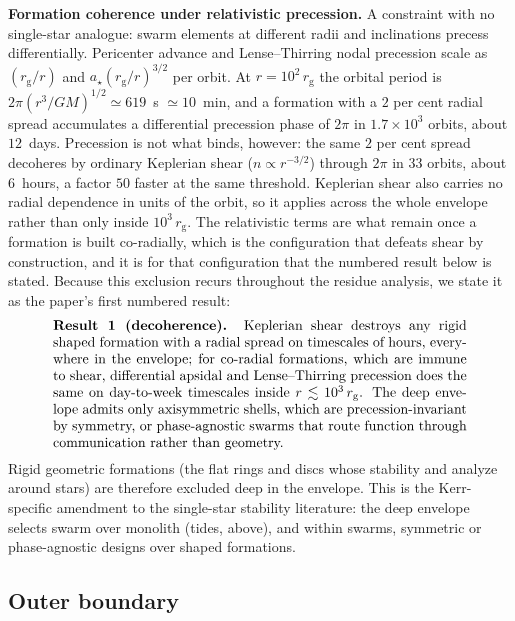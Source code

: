 \documentclass[11pt]{article}
\newcommand{\astar}{\ensuremath{a_\star}}
\newcommand{\rg}{\ensuremath{r_{\mathrm{g}}}}
\begin{document}
\textbf{Formation coherence under relativistic precession.} A constraint with no single-star analogue: swarm elements at different radii and inclinations precess differentially. Pericenter advance and Lense--Thirring nodal precession scale as $(\rg/r)$ and $\astar(\rg/r)^{3/2}$ per orbit. At $r = 10^{2}\,\rg$ the orbital period is $2\pi(r^{3}/GM)^{1/2} \simeq 619$~s $\simeq 10$~min, and a formation with a $2$ per cent radial spread accumulates a differential precession phase of $2\pi$ in $1.7\times10^{3}$ orbits, about $12$~days. Precession is not what binds, however: the same $2$ per cent spread decoheres by ordinary Keplerian shear ($n \propto r^{-3/2}$) through $2\pi$ in $33$ orbits, about $6$~hours, a factor $50$ faster at the same threshold. Keplerian shear also carries no radial dependence in units of the orbit, so it applies across the whole envelope rather than only inside $10^{3}\,\rg$. The relativistic terms are what remain once a formation is built co-radially, which is the configuration that defeats shear by construction, and it is for that configuration that the numbered result below is stated. Because this exclusion recurs throughout the residue analysis, we state it as the paper's first numbered result:
\begin{equation}
\parbox{0.86\linewidth}{\textbf{Result 1 (decoherence).} Keplerian shear destroys any rigid shaped formation with a radial spread on timescales of hours, everywhere in the envelope; for co-radial formations, which are immune to shear, differential apsidal and Lense--Thirring precession does the same on day-to-week timescales inside $r \lesssim 10^{3}\,\rg$. The deep envelope admits only axisymmetric shells, which are precession-invariant by symmetry, or phase-agnostic swarms that route function through communication rather than geometry.}
\label{eq:result1}
\end{equation}
Rigid geometric formations (the flat rings and discs whose stability \citet{McInnes2026} and \citet{Raval2024} analyze around stars) are therefore excluded deep in the envelope. This is the Kerr-specific amendment to the single-star stability literature: the deep envelope selects swarm over monolith (tides, above), and within swarms, symmetric or phase-agnostic designs over shaped formations.

\subsection{Outer boundary}
\label{sec:outer}
\end{document}
